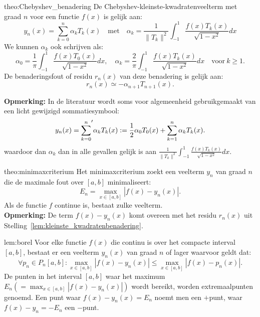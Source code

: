 \begin{theo}{theo:Chebyshev_benadering}
    De Chebyshev-kleinste-kwadratenveelterm met graad $n$ voor een functie $f(x)$ is gelijk aan:
    \begin{equation*}
        y_n(x) = \sum_{k=0}^n \alpha_kT_k(x) \quad \text{met} \quad \alpha_k = \frac{1}{\|T_k\|^2}\int_{-1}^{1} \frac{f(x)T_k(x)}{\sqrt{1-x^2}}dx
    \end{equation*}
    We kunnen $\alpha_k$ ook schrijven als:
    \begin{equation*}
        \alpha_0 = \frac{1}{\pi}\int_{-1}^{1} \frac{f(x)T_0(x)}{\sqrt{1-x^2}}dx, \quad \alpha_k = \frac{2}{\pi}\int_{-1}^{1} \frac{f(x)T_k(x)}{\sqrt{1-x^2}}dx \quad \text{voor} \ k \geq 1.
    \end{equation*}
    De benaderingsfout of residu $r_n(x)$ van deze benadering is gelijk aan:
    \begin{equation*}
        r_n(x) \simeq -\alpha_{n+1}T_{n+1}(x).
    \end{equation*}

    \textbf{Opmerking:} In de literatuur wordt soms voor algemeenheid gebruikgemaakt van een licht gewijzigd sommatiesymbool:
    \begin{equation*}
        y_n(x) = {\sum_{k=0}^{n}}\sp{\prime}  \alpha_kT_k(x) 
        := \frac{1}{2}\alpha_0T_0(x) + \sum_{k=1}^n \alpha_kT_k(x).
    \end{equation*}
    waardoor dan $\alpha_k$ dan in alle gevallen gelijk is aan $\frac{1}{\|T_k\|^2}\int_{-1}^{1} \frac{f(x)T_k(x)}{\sqrt{1-x^2}}dx$.
\end{theo}

\begin{theo}[Minimaxcriterium]{theo:minimaxcriterium}
    Het minimaxcriterium zoekt een veelterm \( y_n \) van graad \( n \) die de maximale fout over \([a,b]\) minimaliseert:
    \begin{equation*}
        E_n = \max_{x\in[a,b]} |f(x) - y_n(x)|.
    \end{equation*}
    Als de functie $f$ continue is, bestaat zulke veelterm. \\

    \textbf{Opmerking:} De term \( f(x) - y_n(x) \) komt overeen met het residu \( r_n(x) \) uit Stelling~\ref{lem:kleinste_kwadratenbenadering}.
\end{theo}


\begin{lem}[Borel]{lem:borel}
    Voor elke functie $f(x)$ die continu is over het compacte interval $[a,b]$, bestaat er een veelterm $y_n(x)$ van graad $n$ of lager waarvoor geldt dat:
    \begin{equation*}
        \forall p_n \in P_n[a,b]: \max_{x\in[a,b]} |f(x) - y_n(x)| \leq \max_{x\in[a,b]} |f(x) - p_n(x)|.
    \end{equation*}
    De punten in het interval $[a,b]$ waar het maximum $E_n \left(= \max_{x\in[a,b]} |f(x) - y_n(x)|\right)$ wordt bereikt, worden extremaalpunten genoemd. Een punt waar $f(x) - y_n(x) = E_n$ noemt men een $+$punt, waar $f(x) - y_n = -E_n$ een $-$punt.
\end{lem}

